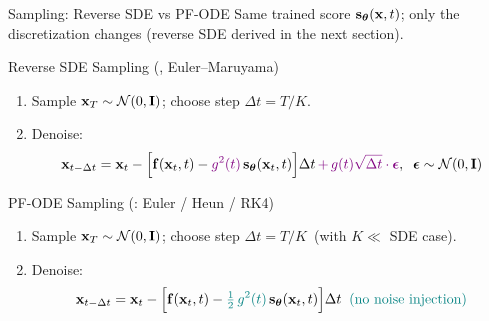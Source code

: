 \documentclass{beamer}
\renewcommand{\eqpause}{}
\begin{document}
\begin{frame}{Sampling: Reverse SDE vs PF-ODE}
	Same trained score $\mathbf{s}_{\boldsymbol{\theta}}(\mathbf{x}, t)$; only the discretization changes (reverse SDE derived in the next section).
	\eqpause
	\begin{block}{Reverse SDE Sampling (\SDESolve, Euler--Maruyama)}
		\begin{enumerate}
			\item Sample $\mathbf{x}_T \sim \mathcal{N}(0, \mathbf{I})$; choose step $\Delta t = T / K$.
			\item Denoise:
			\vspace{-0.2cm}
			\[
				\mathbf{x}_{t - \Delta t} = \mathbf{x}_t - \Bigl[\mathbf{f}(\mathbf{x}_t, t) - {\color{violet}g^2(t)}\, \mathbf{s}_{\boldsymbol{\theta}}(\mathbf{x}_t, t)\Bigr] \Delta t \, {\color{violet}+ \, g(t)\sqrt{\Delta t} \cdot \boldsymbol{\epsilon}}, \;\; \boldsymbol{\epsilon} \sim \mathcal{N}(0, \mathbf{I})
			\]
			\vspace{-0.5cm}
		\end{enumerate}
	\end{block}
	\eqpause
	\begin{block}{PF-ODE Sampling (\ODESolve: Euler / Heun / RK4)}
		\begin{enumerate}
			\item Sample $\mathbf{x}_T \sim \mathcal{N}(0, \mathbf{I})$; choose step $\Delta t = T / K$ \,(with $K \ll$ SDE case).
			\item Denoise:
			\vspace{-0.2cm}
			\[
				\mathbf{x}_{t - \Delta t} = \mathbf{x}_t - \Bigl[\mathbf{f}(\mathbf{x}_t, t) - {\color{teal}\tfrac{1}{2}\, g^2(t)}\, \mathbf{s}_{\boldsymbol{\theta}}(\mathbf{x}_t, t)\Bigr] \Delta t \;\; {\color{teal}(\text{no noise injection})}
			\]
			\vspace{-0.5cm}
		\end{enumerate}
	\end{block}
\end{frame}
\end{document}
